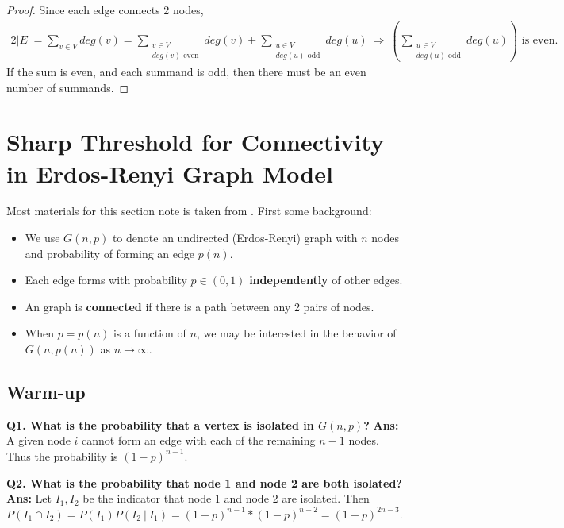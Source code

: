 \documentclass[./some_latex_template.tex]{subfiles}
\begin{document}
\begin{proof}
Since each edge connects 2 nodes, 
\begin{align*}
	2|E| = 	\sum_{v \in V} deg(v) = \sum_{\substack{v \in V\\ deg(v) \text{ even}}} deg(v) + \sum_{\substack{u \in V\\ deg(u) \text{ odd}}} deg(u) \ \Longrightarrow \ \left(\sum_{\substack{u \in V\\ deg(u) \text{ odd}}} deg(u)\right) \text{ is even.}
\end{align*}
If the sum is even, and each summand is odd, then there must be an even number of summands.
\end{proof}

\section{Sharp Threshold for Connectivity in Erdos-Renyi Graph Model}

Most materials for this section note is taken from \cite{Acemoglu, Ramchandran}. First some background:

\begin{itemize}
	\item We use $G(n, p)$ to denote an undirected (Erdos-Renyi) graph with $n$ nodes and probability of forming an edge $p(n)$.
	\item Each edge forms with probability $p \in (0, 1)$ \textbf{independently} of other edges. 
	\item An graph is \textbf{connected} if there is a path between any 2 pairs of nodes. 
	\item When $p = p(n)$ is a function of $n$, we may be interested in the behavior of $G(n, p(n))$ as $n \rightarrow \infty$. 
\end{itemize}

\subsection{Warm-up}

\textbf{Q1. What is the probability that a vertex is isolated in $G(n, p)$?} \textbf{Ans:} A given node $i$ cannot form an edge with each of the remaining $n - 1$ nodes. Thus the probability is $(1 - p)^{n-1}$. 

\noindent \textbf{Q2. What is the probability that node 1 and node 2 are both isolated?} \textbf{Ans:} Let $I_1, I_2$ be the indicator that node 1 and node 2 are isolated. Then $P(I_1 \cap I_2) = P(I_1)P(I_2 \ | \ I_1)  = (1-p)^{n-1} * (1 - p)^{n - 2} = (1 - p)^{2n-3}$. 
\end{document}

